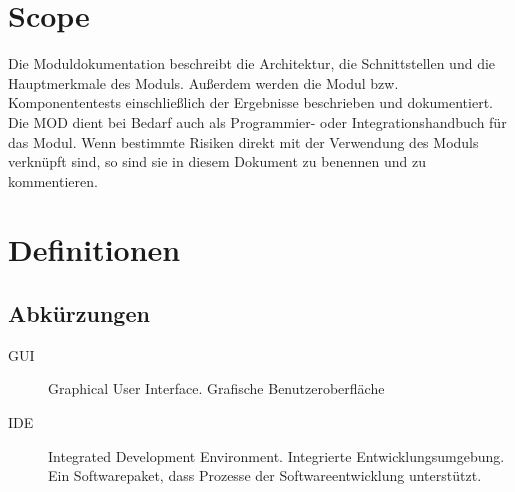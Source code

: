 
\chapter{Scope}
Die Moduldokumentation beschreibt die Architektur, die Schnittstellen 
und die Hauptmerkmale des Moduls. Außerdem werden die Modul bzw. Komponententests 
einschließlich der Ergebnisse beschrieben und dokumentiert. 
Die MOD dient bei Bedarf auch als Programmier- oder Integrationshandbuch für das 
Modul. Wenn bestimmte Risiken direkt mit der Verwendung des Moduls verknüpft sind,
so sind sie in diesem Dokument zu benennen und zu kommentieren.

\chapter{Definitionen}

\section{Abkürzungen}

    \begin{description}
    \item[GUI] Graphical User Interface. Grafische Benutzeroberfläche
    \item[IDE] Integrated Development Environment. Integrierte
    Entwicklungsumgebung. Ein Softwarepaket, dass Prozesse der
    Softwareentwicklung unterstützt.
    \end{description}




